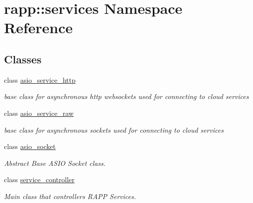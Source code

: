 \hypertarget{namespacerapp_1_1services}{\section{rapp\-:\-:services Namespace Reference}
\label{namespacerapp_1_1services}
}
\subsection*{Classes}
\begin{DoxyCompactItemize}
\item 
class \hyperlink{classrapp_1_1services_1_1asio__service__http}{asio\-\_\-service\-\_\-http}
\begin{DoxyCompactList}\small\item\em base class for asynchronous http websockets used for connecting to cloud services \end{DoxyCompactList}\item 
class \hyperlink{classrapp_1_1services_1_1asio__service__raw}{asio\-\_\-service\-\_\-raw}
\begin{DoxyCompactList}\small\item\em base class for asynchronous sockets used for connecting to cloud services \end{DoxyCompactList}\item 
class \hyperlink{classrapp_1_1services_1_1asio__socket}{asio\-\_\-socket}
\begin{DoxyCompactList}\small\item\em Abstract Base A\-S\-I\-O Socket class. \end{DoxyCompactList}\item 
class \hyperlink{classrapp_1_1services_1_1service__controller}{service\-\_\-controller}
\begin{DoxyCompactList}\small\item\em Main class that controllers R\-A\-P\-P Services. \end{DoxyCompactList}\end{DoxyCompactItemize}
